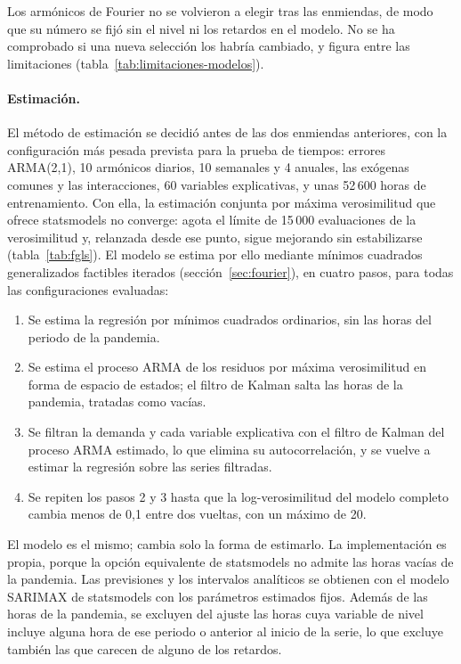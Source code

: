 Los armónicos de Fourier no se volvieron a elegir tras las enmiendas, de
modo que su número se fijó sin el nivel ni los retardos en el modelo. No se
ha comprobado si una nueva selección los habría cambiado, y figura entre las
limitaciones (tabla~\ref{tab:limitaciones-modelos}).

\paragraph{Estimación.} El método de estimación se decidió antes de las dos
enmiendas anteriores, con la configuración más pesada prevista para la prueba
de tiempos: errores ARMA(2,1), 10 armónicos diarios, 10 semanales y 4
anuales, las exógenas comunes y las interacciones, 60 variables
explicativas, y unas 52\,600 horas de entrenamiento. Con ella, la estimación
conjunta por máxima verosimilitud que ofrece statsmodels no converge: agota
el límite de 15\,000 evaluaciones de la verosimilitud y, relanzada desde ese
punto, sigue mejorando sin estabilizarse (tabla~\ref{tab:fgls}). El modelo se
estima por ello mediante mínimos cuadrados generalizados factibles iterados
(sección~\ref{sec:fourier}), en cuatro pasos, para todas las configuraciones
evaluadas:
\begin{enumerate}
	\item Se estima la regresión por mínimos cuadrados ordinarios, sin las horas
	del periodo de la pandemia.
	\item Se estima el proceso ARMA de los residuos por máxima verosimilitud en
	forma de espacio de estados; el filtro de Kalman salta las horas de la
	pandemia, tratadas como vacías.
	\item Se filtran la demanda y cada variable explicativa con el filtro de
	Kalman del proceso ARMA estimado, lo que elimina su autocorrelación, y se
	vuelve a estimar la regresión sobre las series filtradas.
	\item Se repiten los pasos 2 y 3 hasta que la log-verosimilitud del modelo
	completo cambia menos de 0,1 entre dos vueltas, con un máximo de 20.
\end{enumerate}
El modelo es el mismo; cambia solo la forma de estimarlo. La implementación
es propia, porque la opción equivalente de statsmodels no admite las horas
vacías de la pandemia. Las previsiones y los intervalos analíticos se
obtienen con el modelo SARIMAX de statsmodels con los parámetros estimados
fijos. Además de las horas de la pandemia, se excluyen del ajuste las horas
cuya variable de nivel incluye alguna hora de ese periodo o anterior al
inicio de la serie, lo que excluye también las que carecen de alguno de los
retardos.

